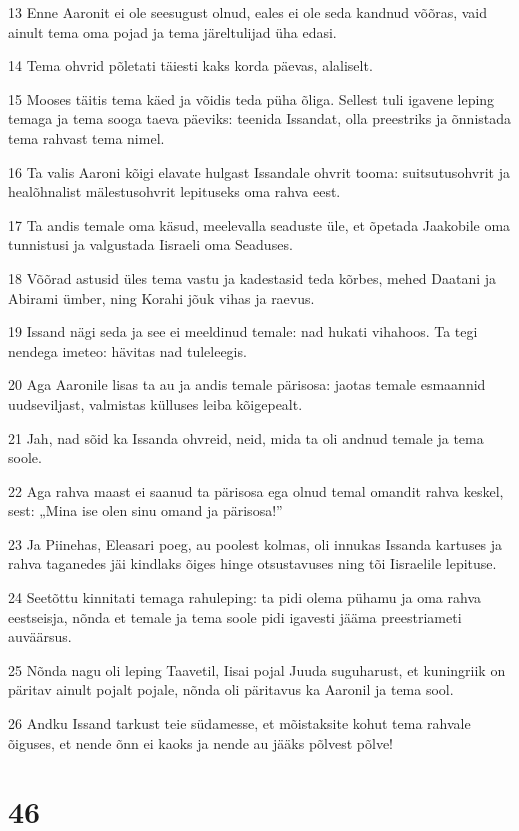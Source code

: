 \par 13 Enne Aaronit ei ole seesugust olnud, eales ei ole seda kandnud võõras, vaid ainult tema oma pojad ja tema järeltulijad üha edasi.
\par 14 Tema ohvrid põletati täiesti kaks korda päevas, alaliselt.
\par 15 Mooses täitis tema käed ja võidis teda püha õliga. Sellest tuli igavene leping temaga ja tema sooga taeva päeviks: teenida Issandat, olla preestriks ja õnnistada tema rahvast tema nimel.
\par 16 Ta valis Aaroni kõigi elavate hulgast Issandale ohvrit tooma: suitsutusohvrit ja healõhnalist mälestusohvrit lepituseks oma rahva eest.
\par 17 Ta andis temale oma käsud, meelevalla seaduste üle, et õpetada Jaakobile oma tunnistusi ja valgustada Iisraeli oma Seaduses.
\par 18 Võõrad astusid üles tema vastu ja kadestasid teda kõrbes, mehed Daatani ja Abirami ümber, ning Korahi jõuk vihas ja raevus.
\par 19 Issand nägi seda ja see ei meeldinud temale: nad hukati vihahoos. Ta tegi nendega imeteo: hävitas nad tuleleegis.
\par 20 Aga Aaronile lisas ta au ja andis temale pärisosa: jaotas temale esmaannid uudseviljast, valmistas külluses leiba kõigepealt.
\par 21 Jah, nad sõid ka Issanda ohvreid, neid, mida ta oli andnud temale ja tema soole.
\par 22 Aga rahva maast ei saanud ta pärisosa ega olnud temal omandit rahva keskel, sest: „Mina ise olen sinu omand ja pärisosa!”
\par 23 Ja Piinehas, Eleasari poeg, au poolest kolmas, oli innukas Issanda kartuses ja rahva taganedes jäi kindlaks õiges hinge otsustavuses ning tõi Iisraelile lepituse.
\par 24 Seetõttu kinnitati temaga rahuleping: ta pidi olema pühamu ja oma rahva eestseisja, nõnda et temale ja tema soole pidi igavesti jääma preestriameti auväärsus.
\par 25 Nõnda nagu oli leping Taavetil, Iisai pojal Juuda suguharust, et kuningriik on päritav ainult pojalt pojale, nõnda oli päritavus ka Aaronil ja tema sool.
\par 26 Andku Issand tarkust teie südamesse, et mõistaksite kohut tema rahvale õiguses, et nende õnn ei kaoks ja nende au jääks põlvest põlve!

\chapter{46}

